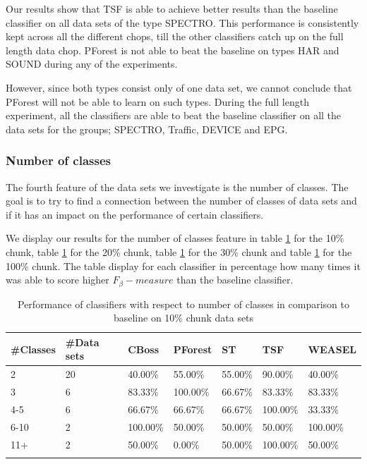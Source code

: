 Our results show that TSF is able to achieve better results than the baseline classifier on all data sets of the type SPECTRO.
This performance is consistently kept across all the different chops, till the other classifiers catch up on the full length data chop.
PForest is not able to beat the baseline on types HAR and SOUND during any of the experiments.

However, since both types consist only of one data set, we cannot conclude that PForest will not be able to learn on such types.
During the full length experiment, all the classifiers are able to beat the baseline classifier on all the data sets for the groups; SPECTRO, Traffic, DEVICE and EPG.


\subsubsection{Number of classes}
The fourth feature of the data sets we investigate is the number of classes.
The goal is to try to find a connection between the number of classes of data sets and if it has an impact on the performance of certain classifiers.

We display our results for the number of classes feature in table \ref{TableNumClass10} for the 10\% chunk, table \ref{TableNumClass10} for the 20\% chunk, table \ref{TableNumClass10} for the 30\% chunk and table \ref{TableNumClass10} for the 100\% chunk.
The table display for each classifier in percentage how many times it was able to score higher $F_{\beta}-measure$ than the baseline classifier.

\begin{table}[hbt!]
	\setlength\extrarowheight{2pt} %
	\begin{tabularx}{\textwidth}{|X|X|X|X|X|X|X|}
	\hline
	\textbf{\#Classes} & \textbf{\#Data sets} & \textbf{CBoss} & \textbf{PForest} & \textbf{ST} & \textbf{TSF} & \textbf{WEASEL} \\ \hline
		2 & 20 & 40.00\% & 55.00\% & 55.00\% & 90.00\% & 40.00\% \\ \hline
		3 & 6 & 83.33\% & 100.00\% & 66.67\% & 83.33\% & 83.33\% \\ \hline
		4-5 & 6 & 66.67\% & 66.67\% & 66.67\% & 100.00\% & 33.33\% \\ \hline
		6-10 & 2 & 100.00\% & 50.00\% & 50.00\% & 50.00\% & 100.00\% \\ \hline
		11+ & 2 & 50.00\% & 0.00\% & 50.00\% & 100.00\% & 50.00\% \\ \hline
  \caption{Performance of classifiers with respect to number of classes in comparison to baseline on 10\% chunk data sets}
  \label{TableNumClass10}
  \end{tabularx}
\end{table}

